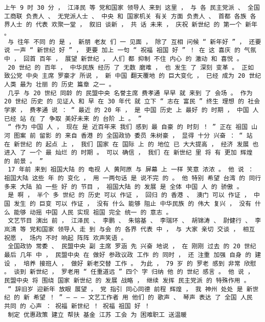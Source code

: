 \documentclass{article}
\begin{document}
\begin{Verbatim}[commandchars=\\\{\}]
 上午 9 时 30 分 ， 江泽民 等 党和国家 领导人 来到 这里 ， 与 各 民主党派 、 全国工商联 负责人 、 无党派人士 、 中央 和 国家机关 有关 方面 负责人 、 首都 各族 各界人士 的 代表 欢聚一堂 ， 叙旧 谈新 ， 共 话 未来 ， 庆祝 新世纪 的 第一个 新年 。 
 与 往年 不同 的 是 ， 新朋 老友 们 一 见面 ， 除了 互相 问候 “ 新年好 ” ， 还要 说 一声 “ 新世纪 好 ” ， 更要 加上 一句 “ 祝福 祖国 好 ” ！ 在 这 喜庆 的 气氛 中 ， 回首 百年 ， 展望 新世纪 ， 人们 都 抑制 不住 内心 的 激动 和 喜悦 。 
 20 世纪 的 百年 ， 中华民族 经历 了 无数 磨难 ， 也 发生 了 深刻 变革 。 正如 致公党 中央 主席 罗豪才 所说 ， 新 中国 翻天覆地 的 巨大变化 ， 已经 成为 20 世纪 人类 最为 壮丽 的 历史 篇章 之一 。 
 几乎 与 20 世纪 同龄 的 民盟中央 名誉主席 费孝通 早早 就 来到 了 会场 。 作为 20 世纪 历史 的 见证人 和 早 在 30 年代 就 立下 “ 志在 富民 ” 终生 理想 的 社会学家 ， 费孝通 说 ： “ 最近 的 20 年 ， 是 中国 历史 上 最好 的 时期 ， 中国 人 已经 站 在 了 争取 美好未来 的 台阶 上 。 ” 
 “ 作为 中国 人 ， 现在 是 近百年来 我们 感到 最 自豪 的 时刻 ！ ” 正在 祖国 山河 图案 前 留影 的 来自 香港 的 全国政协 委员 朱树豪 ， 显得 十分 兴奋 ： “ 站 在 新世纪 的 起点 上 ， 我们 国家 在 国际 上 的 地位 已 大大提高 ， 经济 发展 也 进入 了 一个 最 灿烂 的 时期 。 可以 确信 ， 我们 在 新世纪 里 将 有 更加 辉煌 的 前景 。 ” 
 17 年前 来到 祖国大陆 的 电视 人 黄阿原 与 屏幕 上 一样 笑意 浓浓 。 他 说 ： 祖国大陆 这些 年 的 变化 ， 用 一两句话 是 说不完 的 。 他 特别 希望 台湾 的 同行 多来 大陆 拍 一些 好 的 节目 ， 祖国大陆 的 发展 是 全体 中国 人 的 骄傲 。 
 是 啊 ， 半个 多 世纪 的 历史 可以 作证 ， 回归 的 香港 、 澳门 可以 作证 ， 中国 发生 的 巨变 可以 作证 ， 没有 什么 能够 阻止 中华民族 的 伟大 复兴 ， 没有 什么 能够 动摇 中国 人民 实现 祖国 完全 统一 的 意志 。 
 文艺节目 演出 前 ， 江泽民 、 李鹏 、 朱镕基 、 李瑞环 、 胡锦涛 、 尉健行 、 李岚清 等 党和国家 领导人 走 到 与会 的 各界 代表 中 ， 与 大家 亲切 交谈 ， 相互 祝愿 ， 场内 不时 响起 阵阵 欢声笑语 。 
 全国政协 常委 、 民盟中央 副 主席 罗涵 先 兴奋 地说 ， 在 刚刚 过去 的 20 世纪 最后 几年 中 ， 民盟中央 在 做好 参政议政 工作 的 同时 ， 还 注重 加强 自身 的 建设 ， 培养 接班人 ， 做好 新老交替 工作 。 为此 ， 79 岁 的 罗老 感到 非常 欣慰 。 谈到 新世纪 ， 罗老用 “ 任重道远 ” 四个 字 归纳 他 的 世纪 感言 。 他 说 ， 民盟中央 将 围绕 国家 新世纪 的 发展 战略 ， 继续 发挥 民主党派 的 特殊作用 。 
 “ 辞旧岁 迎新年 放眼 展望 ， 党 指引 同心同德 前程 辉煌 ， 我 神州 处处 是 新世纪 的 新 希望 ！ ” — — — 文艺工作者 用 他们 的 歌声 、 琴声 表达 了 全国 人民 共同 的 心声 ： 祝福 新世纪 ！ 祝福 祖国 好 ！ 
 制定 优惠政策 建立 帮扶 基金 江苏 工会 为 困难职工 送温暖 

\end{Verbatim}
\end{document}
